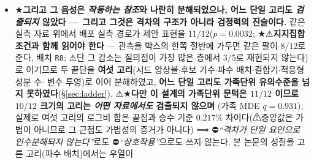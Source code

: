\documentclass[11pt]{report}
\numberwithin{equation}{chapter}
\numberwithin{figure}{chapter}
\numberwithin{table}{chapter}
\begin{document}
\begin{itemize}
        ★\textbf{그리고 소거표의 \emph{관측 기하} 행에서 \emph{피복}(공간)과
        \emph{채점 rung}(시간) 두 성분이 배제되었다}
        --- 동결 혼잡 코퍼스를 최근접 관측점까지의 거리로 분해해 재채점하면 \textbf{실측
        $12$ 레코드가 점유하는 대역 안에서도 확증 문턱을 넘는다}($\mathbf{45/48}$, 상대
        중앙 $\mathbf{-31.69\%}$; 비교자 유효성 $48/48$; \S\ref{sec:results_m10}).
        ⛔\emph{``관측 기하가 무관하다''}로 넓히지 않으며(등가 검정을 하지 않았다),
        ⚠이 배치의 수는 \textbf{GPU 산물}이고 ⛔재채점이므로 기제를 지목하지 않는다.
        ⟹ 본 논문은 \textbf{작동 경계의 위치를 보고하고, \emph{파랑 조건} 축을
        배제하되, 그 경계가 놓인 축과 그 축 위의 원인은 제시하지 않는다}
        (\S\ref{sec:boundary}, \S\ref{sec:init-bank}).

  \item ★\textbf{그리고 그 음성은 \emph{작동하는 참조}와 나란히 분해되었으나, 어느
        단일 고리도 \emph{검출되지} 않았다 --- 그리고 그것은 격차의 구조가 아니라
        검정력의 진술이다.} 같은 실측 자료 위에서 배포 실측 경로가 제안
        표현을 $11/12$($p = 0.0032$; ★⚠\textbf{지지집합 조건과 함께 읽어야 한다} ---
        관측을 박스의 한쪽 절반에 가두면 같은 팔이 \textbf{$8/12$}로 준다, 배치
        \texttt{R8}; ⚠단 그 감소는 질의점이 가장 많은 층에서 $3/5$로 재현되지 않는다)로
        이기므로 두 끝단을 \textbf{여섯 고리}(시드
        앙상블$\cdot$후보 기수$\cdot$파수 배치$\cdot$결합기$\cdot$적응형 성분 수$\cdot$
        변수 투영)로 이어 분해하였고, \textbf{어느 단일 고리도 가족단위 유의수준을 넘지
        못하였다}(\S\ref{sec:ladder}). ⚠★\textbf{다만 이 설계의 가족단위 문턱은
        $11/12$ 이므로 $10/12$ 크기의 고리는 \emph{어떤 자료에서도} 검출되지 않으며}
        (가족 MDE $q = 0.931$), 실제로 여섯 고리의 로그비 합은 끝점과 승수 기준
        \textbf{$0.217\%$} 차이다(⚠중앙값은 가법이 아니므로 그 근접도 가법성의 증거가
        아니다) ⟹ ⛔\emph{``격차가 단일 요인으로 인수분해되지 않는다''}로도
        ⛔\emph{``상호작용''}으로도 쓰지 않는다.
        본 논문의 성질을 고른 고리(파수 배치)에서는 우열이

\end{itemize}
\end{document}
